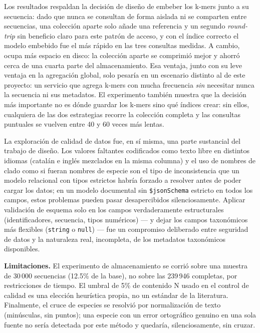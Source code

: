 \documentclass[pdflatex,sn-vancouver-num,lineno,referee]{sn-jnl}
\begin{document}
Los resultados respaldan la decisión de diseño de embeber los k-mers junto a
su secuencia: dado que nunca se consultan de forma aislada ni se comparten
entre secuencias, una colección aparte solo añade una referencia y un segundo
\emph{round-trip} sin beneficio claro para este patrón de acceso, y con el
índice correcto el modelo embebido fue el más rápido en las tres consultas
medidas. A cambio, ocupa más espacio en disco: la colección aparte se
comprimió mejor y ahorró cerca de una cuarta parte del almacenamiento. Esa
ventaja, junto con su leve ventaja en la agregación global, solo pesaría en un
escenario distinto al de este proyecto: un servicio que agrega k-mers con
mucha frecuencia \emph{sin} necesitar nunca la secuencia ni sus metadatos.
El experimento también muestra que la decisión más importante no es dónde
guardar los k-mers sino qué índices crear: sin ellos, cualquiera de las dos
estrategias recorre la colección completa y las consultas puntuales se
vuelven entre 40 y 60 veces más lentas.

La exploración de calidad de datos fue, en sí misma, una parte sustancial del
trabajo de diseño. Los valores faltantes codificados como texto libre en
distintos idiomas (catalán e inglés mezclados en la misma columna) y el uso
de nombres de clado como si fueran nombres de especie son el tipo de
inconsistencia que un modelo relacional con tipos estrictos habría forzado a
resolver antes de poder cargar los datos; en un modelo documental sin
\texttt{\$jsonSchema} estricto en todos los campos, estos problemas pueden
pasar desapercibidos silenciosamente. Aplicar validación de esquema solo en
los campos verdaderamente estructurales (identificadores, secuencia, tipos
numéricos) --- y dejar los campos taxonómicos más flexibles (\texttt{string}
o \texttt{null}) --- fue un compromiso deliberado entre seguridad de datos y
la naturaleza real, incompleta, de los metadatos taxonómicos disponibles.

\textbf{Limitaciones.} El experimento de almacenamiento se corrió sobre una
muestra de 30\,000 secuencias (12.5\% de la base), no sobre las 239\,946
completas, por restricciones de tiempo. El umbral de 5\% de contenido N
usado en el control de calidad es una elección heurística propia, no un
estándar de la literatura. Finalmente, el cruce de especies se resolvió por
normalización de texto (minúsculas, sin puntos); una especie con un error
ortográfico genuino en una sola fuente no sería detectada por este método y
quedaría, silenciosamente, sin cruzar.
\end{document}
